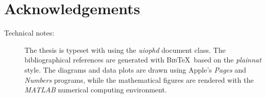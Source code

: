 \chapter*{Acknowledgements}





\null
\vfill
\begin{description}
\item [Technical notes: ] The thesis is typeset with \LaTeXe using the \textit{uiophd} document class. The bibliographical references are generated with \textsc{Bib}\negthinspace\TeX \  based on the \textit{plainnat} style. The diagrams and data plots are drawn using Apple's \textit{Pages} and \textit{Numbers} programs, while the mathematical figures are rendered with the \textit{MATLAB} numerical computing environment.
\end{description}